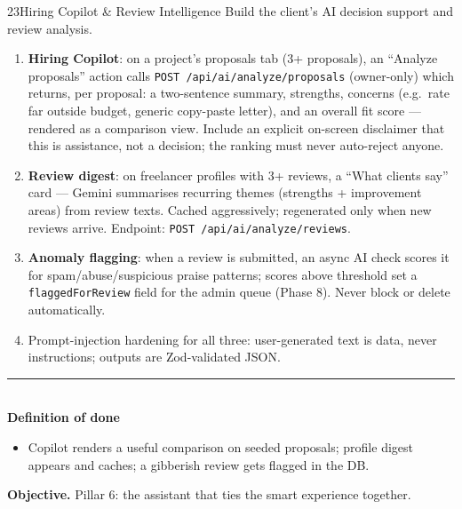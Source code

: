 \documentclass[11pt,a4paper]{article}
\newcommand{\dod}{\medskip\noindent\textcolor{donegreen}{\rule{\linewidth}{0.5pt}}\\[1mm]\textbf{\textcolor{donegreen}{Definition of done}}\\[-2mm]}
\newcommand{\objective}[1]{\noindent\textbf{Objective.} #1\medskip}
\begin{document}
\begin{promptbox}{23}{Hiring Copilot \& Review Intelligence}
Build the client's AI decision support and review analysis.

\begin{enumerate}[leftmargin=1.6em]
  \item \textbf{Hiring Copilot}: on a project's proposals tab (3+ proposals), an
        ``Analyze proposals'' action calls \texttt{POST /api/ai/analyze/proposals}
        (owner-only) which returns, per proposal: a two-sentence summary, strengths,
        concerns (e.g.\ rate far outside budget, generic copy-paste letter), and an
        overall fit score --- rendered as a comparison view. Include an explicit
        on-screen disclaimer that this is assistance, not a decision; the ranking
        must never auto-reject anyone.
  \item \textbf{Review digest}: on freelancer profiles with 3+ reviews, a ``What
        clients say'' card --- Gemini summarises recurring themes (strengths +
        improvement areas) from review texts. Cached aggressively; regenerated only
        when new reviews arrive. Endpoint: \texttt{POST /api/ai/analyze/reviews}.
  \item \textbf{Anomaly flagging}: when a review is submitted, an async AI check
        scores it for spam/abuse/suspicious praise patterns; scores above threshold
        set a \texttt{flaggedForReview} field for the admin queue (Phase 8). Never
        block or delete automatically.
  \item Prompt-injection hardening for all three: user-generated text is data, never
        instructions; outputs are Zod-validated JSON.
\end{enumerate}

\dod
\begin{itemize}[leftmargin=1.6em]
  \item Copilot renders a useful comparison on seeded proposals; profile digest
        appears and caches; a gibberish review gets flagged in the DB.
\end{itemize}
\end{promptbox}

\objective{Pillar 6: the assistant that ties the smart experience together.}
\end{document}
